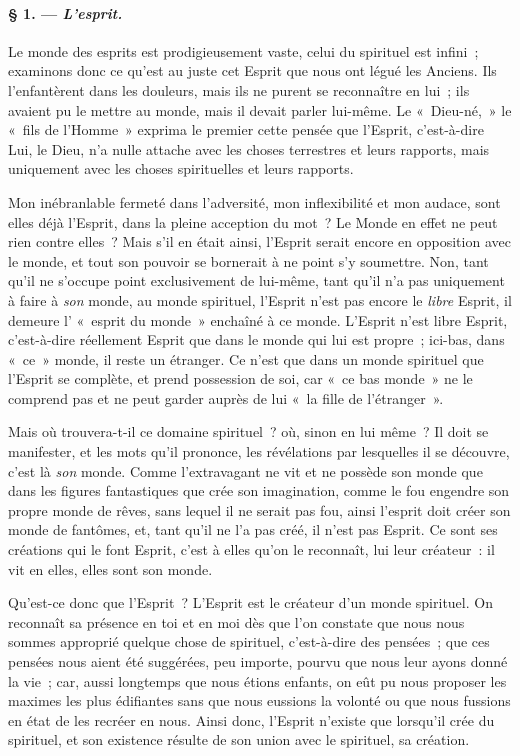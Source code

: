 \documentclass[french,twoside]{book} %
\begin{document}
 \paragraph[{§ 1. — L’esprit.}]{§ 1. — \emph{L’esprit.}}
\noindent Le monde des esprits est prodigieusement vaste, celui du spirituel est infini ; examinons donc ce qu’est au juste cet Esprit que nous ont légué les Anciens. Ils l’enfantèrent dans les douleurs, mais ils ne purent se reconnaître en lui ; ils avaient pu le mettre au monde, mais il devait parler lui-même. Le « Dieu-né, » le « fils de l’Homme » exprima le premier cette pensée que l’Esprit, c’est-à-dire Lui, le Dieu, n’a nulle attache avec les choses terrestres et leurs rapports, mais uniquement avec les choses spirituelles et leurs rapports.\par
Mon inébranlable fermeté dans l’adversité, mon inflexibilité et mon audace, sont elles déjà l’Esprit, dans la pleine acception du mot ? Le Monde en effet ne peut rien contre elles ? Mais s’il en était ainsi, l’Esprit serait encore en opposition avec le monde, et tout son pouvoir se bornerait à ne point s’y soumettre. Non, tant qu’il ne s’occupe point exclusivement de lui-même, tant qu’il n’a pas uniquement à faire à \emph{son }monde, au monde spirituel, l’Esprit n’est pas encore le \emph{libre} Esprit, il demeure l’ « esprit du monde » enchaîné à ce monde. L’Esprit n’est libre Esprit, c’est-à-dire réellement Esprit que dans le monde qui lui est propre ; ici-bas, dans « ce » monde, il reste un étranger. Ce n’est que dans un monde spirituel que l’Esprit se complète, et prend possession de soi, car « ce bas monde » ne le comprend pas et ne peut garder auprès de lui « la fille de l’étranger ».\par
Mais où trouvera-t-il ce domaine spirituel ? où, sinon en lui même ? Il doit se manifester, et les mots qu’il prononce, les révélations par lesquelles il se découvre, c’est là \emph{son} monde. Comme l’extravagant ne vit et ne possède son monde que dans les figures fantastiques que crée son imagination, comme le fou engendre  son propre monde de rêves, sans lequel il ne serait pas fou, ainsi l’esprit doit créer son monde de fantômes, et, tant qu’il ne l’a pas créé, il n’est pas Esprit. Ce sont ses créations qui le font Esprit, c’est à elles qu’on le reconnaît, lui leur créateur : il vit en elles, elles sont son monde.\par
Qu’est-ce donc que l’Esprit ? L’Esprit est le créateur d’un monde spirituel. On reconnaît sa présence en toi et en moi dès que l’on constate que nous nous sommes approprié quelque chose de spirituel, c’est-à-dire des pensées ; que ces pensées nous aient été suggérées, peu importe, pourvu que nous leur ayons donné la vie ; car, aussi longtemps que nous étions enfants, on eût pu nous proposer les maximes les plus édifiantes sans que nous eussions la volonté ou que nous fussions en état de les recréer en nous. Ainsi donc, l’Esprit n’existe que lorsqu’il crée du spirituel, et son existence résulte de son union avec le spirituel, sa création.\par
\end{document}
